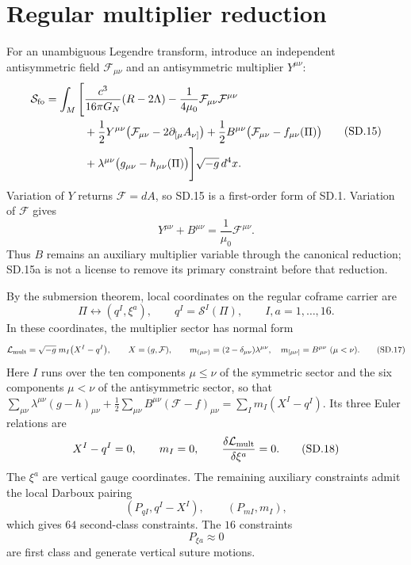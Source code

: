 \documentclass[10pt]{article}
\begin{document}
\section{Regular multiplier reduction}

For an unambiguous Legendre transform, introduce an independent antisymmetric
field $\mathcal F_{\mu\nu}$ and an antisymmetric multiplier $Y^{\mu\nu}$:
\[
\begin{aligned}
\mathcal S_{\rm fo}=\int_M\Bigg[&\frac{c^3}{16\pi G_N}(R-2\Lambda)
-\frac1{4\mu_0}\mathcal F_{\mu\nu}\mathcal F^{\mu\nu}\\
&+\frac12Y^{\mu\nu}\bigl(\mathcal F_{\mu\nu}-2\partial_{[\mu}A_{\nu]}\bigr)
+\frac12B^{\mu\nu}\bigl(\mathcal F_{\mu\nu}-f_{\mu\nu}(\Pi)\bigr)\\
&+\lambda^{\mu\nu}\bigl(g_{\mu\nu}-h_{\mu\nu}(\Pi)\bigr)\Bigg]
\sqrt{-g}\,d^4x.
\end{aligned}
\tag{SD.15}
\]
Variation of $Y$ returns $\mathcal F=dA$, so SD.15 is a first-order form of
SD.1. Variation of $\mathcal F$ gives
\[
Y^{\mu\nu}+B^{\mu\nu}=\frac{1}{\mu_0}\mathcal F^{\mu\nu}.
\tag{SD.15a}
\]
Thus $B$ remains an auxiliary multiplier variable through the canonical
reduction; SD.15a is not a license to remove its primary constraint before
that reduction.

By the submersion theorem, local coordinates on the regular coframe carrier
are
\[
\Pi\longleftrightarrow(q^I,\xi^a),
\qquad
q^I=\mathscr S^I(\Pi),
\qquad I,a=1,\ldots,16.
\tag{SD.16}
\]
In these coordinates, the multiplier sector has normal form
\[
\mathcal L_{\rm mult}=\sqrt{-g}\;m_I\bigl(X^I-q^I\bigr),
\qquad
X=(g,\mathcal F),
\qquad
m_{(\mu\nu)}=(2-\delta_{\mu\nu})\lambda^{\mu\nu},\quad
m_{[\mu\nu]}=B^{\mu\nu}\ (\mu<\nu).
\tag{SD.17}
\]
Here $I$ runs over the ten components $\mu\le\nu$ of the symmetric sector and
the six components $\mu<\nu$ of the antisymmetric sector, so that
$\sum_{\mu\nu}\lambda^{\mu\nu}(g-h)_{\mu\nu}
+\frac12\sum_{\mu\nu}B^{\mu\nu}(\mathcal F-f)_{\mu\nu}
=\sum_I m_I(X^I-q^I)$.
Its three Euler relations are
\[
X^I-q^I=0,
\qquad m_I=0,
\qquad \frac{\delta\mathcal L_{\rm mult}}{\delta\xi^a}=0.
\tag{SD.18}
\]
The $\xi^a$ are vertical gauge coordinates. The remaining auxiliary
constraints admit the local Darboux pairing
\[
(P_{qI},q^I-X^I),
\qquad
(P_{mI},m_I),
\tag{SD.19}
\]
which gives $64$ second-class constraints. The $16$ constraints
\[
P_{\xi a}\approx0
\tag{SD.20}
\]
are first class and generate vertical suture motions.
\end{document}
